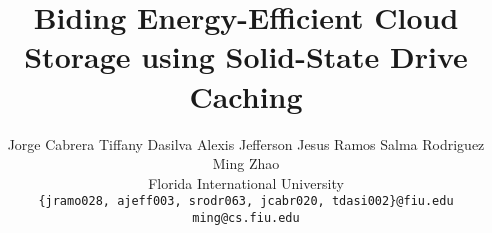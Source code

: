 \documentclass[letterpaper,twocolumn,10pt]{article}
\title{\Large \bf Biding Energy-Efficient Cloud Storage using Solid-State Drive
  Caching}
\author{
  \qquad
  {\rm Jorge Cabrera}
  \qquad
  {\rm Tiffany Dasilva}
  \qquad
  {\rm Alexis Jefferson}
  \qquad
  {\rm Jesus Ramos}
  \qquad
  {\rm Salma Rodriguez}
  \\
  \qquad
  {\rm Ming Zhao}
  \\
  Florida International University
  \\
  {\rm \texttt{\{jramo028, ajeff003, srodr063, jcabr020, tdasi002\}@fiu.edu}}
  \\
  {\rm \texttt{ming@cs.fiu.edu}}
}
\date{}
\begin{document}
\maketitle












{
  \footnotesize
  
  
}
\end{document}
